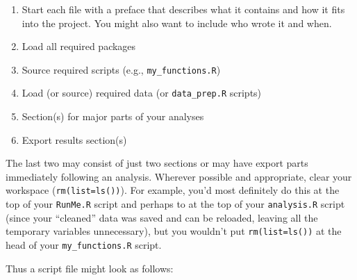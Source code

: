 \documentclass[12pt,letterpaper]{article}
\begin{document}
\begin{enumerate}

	\item Start each file with a preface that describes what it contains and how it fits into the project. You might also want to include who wrote it and when.

	\item Load all required packages

	\item Source required scripts (e.g., \texttt{my\_functions.R})

	\item Load (or source) required data (or \texttt{data\_prep.R} scripts)

	\item Section(s) for major parts of your analyses

	\item Export results section(s)

\end{enumerate}
The last two may consist of just two sections or may have export parts immediately following an analysis.  Wherever possible and appropriate, clear your workspace (\texttt{rm(list=ls())}).  For example, you'd most definitely do this at the top of your \texttt{RunMe.R} script and perhaps to at the top of your \texttt{analysis.R} script (since your ``cleaned'' data was saved and can be reloaded, leaving all the temporary variables unnecessary), but you wouldn't put \texttt{rm(list=ls())} at the head of your \texttt{my\_functions.R} script.

Thus a script file might look as follows:
\end{document}
